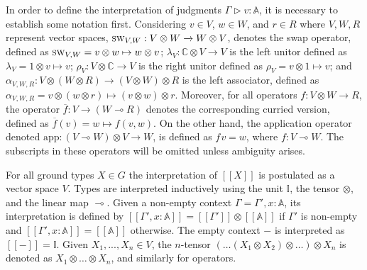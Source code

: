 In order to define the interpretation of judgments $\Gamma \triangleright v: \mathbb{A}$, it is necessary to establish some notation first. Considering $v \in V$, $w \in W$, and $r \in R$  where $V, W, R$ represent vector spaces,  $\textsc{sw}_{V,W} : V\otimes W \xrightarrow{} W \otimes V$, denotes the swap operator, defined as $\textsc{sw}_{V,W}= v\otimes w \mapsto w \otimes v$;    $\lambda_{V} : \mathbb{C} \otimes V \xrightarrow{} V $ is the left unitor defined as $\lambda_{V}= 1 \otimes v \mapsto v $; $\rho_{V} : V  \otimes \mathbb{C} \xrightarrow{} V $ is the right unitor defined as $\rho_{V}= v \otimes 1 \mapsto v$; and $\alpha_{V,W,R} : V  \otimes (W \otimes R) \xrightarrow{} (V  \otimes W) \otimes R$ is the left associator, defined as $\alpha_{V,W,R}= v \otimes (w \otimes r) \mapsto (v \otimes w) \otimes r $. Moreover, for all operators $f: V \otimes W \xrightarrow{} R$, the operator $\overline{f} : V \xrightarrow{} (W \multimap R)$ denotes the corresponding curried version, defined as $\overline{f}(v) = w \mapsto  f(v,w)$. On the other hand, the application operator denoted $\text{app}: (V \multimap W) \otimes V \rightarrow W$, is defined as $f\hspace{1pt} v = w $, where $f: V \multimap W $.   The subscripts in these operators will be omitted unless ambiguity arises. 

For all ground types $X \in G$  the interpretation of $[\![X]\!]$  is postulated as a vector space $V$. Types are interpreted inductively using the unit $\mathbb{I}$, the tensor $\otimes$, and the linear map $\multimap$. Given a non-empty context $\Gamma=\Gamma',x: \mathbb{A}$, its interpretation is defined by $[\![\Gamma',x: \mathbb{A}]\!] = [\![\Gamma']\!] \otimes [\![\mathbb{A}]\!]$ if $\Gamma'$ is non-empty and $[\![\Gamma',x: \mathbb{A}]\!] = [\![\mathbb{A}]\!]$ otherwise. The empty context $-$ is interpreted as $[\![-]\!] = \mathbb{I}$. Given $X_{1}, . . . ,X_{n} \in V$, the $n$-tensor $(\ldots (X_1 \otimes X_2) \otimes \ldots ) \otimes X_{n}$ is denoted as $X_1 \otimes \ldots \otimes X_{n}$, and similarly for operators. 


